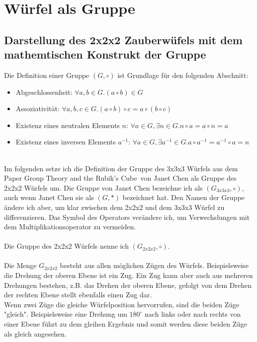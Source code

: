\documentclass[12pt,a4paper, usenames, dvipsnames]{scrartcl}
\begin{document}
\section{Würfel als Gruppe}

\subsection*{Darstellung des 2x2x2 Zauberwüfels mit dem mathemtischen Konstrukt der Gruppe}

Die Definition einer Gruppe $(G, \circ)$ ist Grundlage für den folgenden Abschnitt:
\begin{itemize}
\item Abgeschlossenheit: $\forall a,b \in G.(a \circ b) \in G $
\item Assoziativität: $\forall a,b,c \in G.(a \circ b) \circ c = a \circ (b \circ c)$
\item Existenz eines neutralen Elements $n$: $\forall a \in G, \exists n \in G.n \circ a = a \circ n = a$ 
\item Existenz eines inversen Elements $a^{-1}$: $\forall a \in G, \exists a^{-1} \in G. a \circ a^{-1} = a^{-1} \circ a = n$ 
\end{itemize}
\ \\
Im folgenden setze ich die Definition der Gruppe des 3x3x3 Würfels aus dem Paper \glqq Group Theory and the Rubik's Cube\grqq \  von Janet Chen als Gruppe des 2x2x2 Würfels um. Die Gruppe von Janet Chen bezeichne ich als $(G_{3x3x3}, \circ)$, auch wenn Janet Chen sie als $(G, *)$ bezeichnet hat. Den Namen der Gruppe ändere ich aber, um klar zwischen dem 2x2x2 und dem 3x3x3 Würfel zu differenzieren. Das Symbol des Operators verändere ich, um Verwechslungen mit dem Multiplikationsoperator zu vermeiden. \\
\\ 
Die Gruppe des 2x2x2 Würfels nenne ich $(G_{2x2x2}, \circ)$. \\
\\
Die Menge $G_{2x2x2}$ besteht aus allen möglichen Zügen des Würfels. Beispielsweise die Drehung der oberen Ebene ist ein Zug. Ein Zug kann aber auch aus mehreren Drehungen bestehen, z.B. das Drehen der oberen Ebene, gefolgt von dem Drehen der rechten Ebene stellt ebenfalls einen Zug dar. \\
Wenn zwei Züge die gleiche Würfelposition hervorrufen, sind die beiden Züge "gleich". Beispielsweise eine Drehung um $180^{\circ}$ nach links oder nach rechts von einer Ebene führt zu dem gleihen Ergebnis und somit werden diese beiden Züge als gleich angesehen. \\
\end{document}
